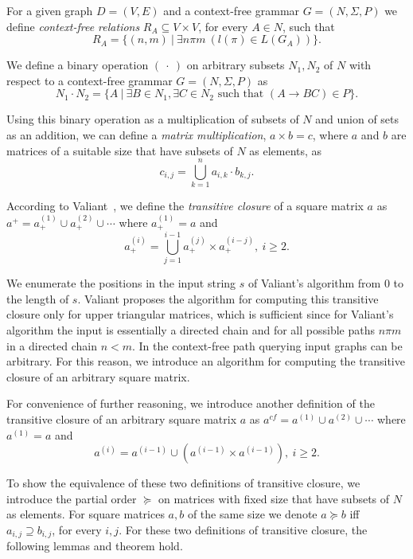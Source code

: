 \documentclass[runningheads,a4paper]{llncs}
\begin{document}
For a given graph $D = (V, E)$ and a context-free grammar $G = (N, \Sigma, P)$ we define \textit{context-free relations} $R_A \subseteq V \times V$, for every $A \in N$, such that $$R_A = \{(n,m)~|~\exists n \pi m~(l(\pi) \in L(G_A))\}.$$

We define a binary operation $(~\cdot~)$ on arbitrary subsets $N_1 , N_2$ of $N$ with respect to a context-free grammar $G = (N, \Sigma, P)$ as $$N_1 \cdot N_2 = \{A~|~\exists B \in N_1, \exists C \in N_2 \text{ such that }(A \rightarrow B C) \in P\}.$$

Using this binary operation as a multiplication of subsets of $N$ and union of sets as an addition, we can define a \textit{matrix multiplication}, $a \times b = c$, where $a$ and $b$ are matrices of a suitable size that have subsets of $N$ as elements, as $$c_{i,j} = \bigcup^{n}_{k=1}{a_{i,k} \cdot b_{k,j}}.$$

According to Valiant~\cite{valiant}, we define the \textit{transitive closure} of a square matrix $a$ as $a^+ = a^{(1)}_+ \cup a^{(2)}_+ \cup \cdots$ where $a^{(1)}_+ = a$ and $$a^{(i)}_+ = \bigcup^{i-1}_{j=1}{a^{(j)}_+ \times a^{(i-j)}_+}, ~i \ge 2.$$

We enumerate the positions in the input string $s$ of Valiant's algorithm from 0 to the length of $s$. Valiant proposes the algorithm for computing this transitive closure only for upper triangular matrices, which is sufficient since for Valiant's algorithm the input is essentially a directed chain and for all possible paths $n \pi m$ in a directed chain $n < m$. In the context-free path querying input graphs can be arbitrary. For this reason, we introduce an algorithm for computing the transitive closure of an arbitrary square matrix.

For convenience of further reasoning, we introduce another definition of the transitive closure of an arbitrary square matrix $a$ as $a^{cf} = a^{(1)} \cup a^{(2)} \cup \cdots$ where $a^{(1)} = a$ and $$a^{(i)} = a^{(i-1)} \cup (a^{(i-1)} \times a^{(i-1)}), ~i \ge 2.$$

To show the equivalence of these two definitions of transitive closure, we introduce the partial order $\succeq$ on matrices with fixed size that have subsets of $N$ as elements. For square matrices $a, b$ of the same size we denote $a \succeq b$ iff $a_{i,j} \supseteq b_{i,j}$, for every $i, j$. For these two definitions of transitive closure, the following lemmas and theorem hold.
\end{document}
